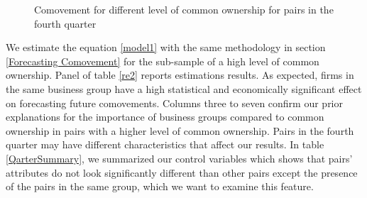 			
						\begin{figure}[htbp]
							\centerfloat
							\caption{Comovement for different level of common ownership for pairs in the fourth quarter}
								\label{Qmcorr5subsample}
						\end{figure}
			
			
	
	We estimate the equation \ref{model1} with the same methodology in section \ref{Forecasting Comovement}  for the sub-sample of a high level of common ownership. Panel  of table \ref{re2}  reports estimations results. As expected, firms in the same business group have a high statistical and economically significant effect on forecasting future comovements. Columns three to seven confirm our prior explanations for the importance of business groups compared to common ownership in pairs with a higher level of common ownership. Pairs in the fourth quarter may have different characteristics that affect our results.  In table \ref{QarterSummary}, we summarized our control variables which shows that pairs' attributes do not look significantly different than other pairs except the presence of the pairs in the same group, which we want to examine this feature.
	
